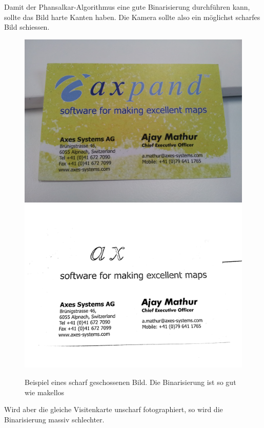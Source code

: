 \documentclass[10pt]{article}
\begin{document}
Damit der Phansalkar-Algorithmus eine gute Binarisierung durchführen kann, sollte das Bild harte Kanten haben. Die Kamera sollte also ein möglichst scharfes Bild schiessen.
\begin{figure}[h!]
	\centering
	\includegraphics[scale= 0.06]{AMathur.jpg}
	\includegraphics[scale= 0.06]{AMathurPhansalkar.png}
\caption{Beispiel eines scharf geschossenen Bild. Die Binarisierung ist so gut wie makellos}
\end{figure}

Wird aber die gleiche Visitenkarte unscharf fotographiert, so wird die Binarisierung massiv schlechter.
\end{document}
